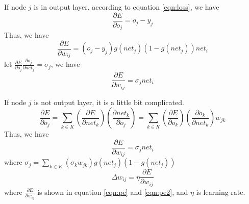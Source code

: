 \documentclass[11pt,letterpaper]{article}
\begin{document}
If node $j$ is in output layer, according to equation \ref{eqn:loss}, we have
\begin{equation}
\label{eqn:partialEOj}
\frac{\partial E}{\partial o_j}  = o_j-y_j
\end{equation}
Thus, we have 
$$\frac{\partial E}{\partial w_{ij}} = (o_j-y_j)g(net_j)(1-g(net_j))net_i$$
let $ \frac{\partial E}{\partial o_j} \frac{\partial o_j}{\partial net_j} = \sigma_j$, we have
\begin{equation}
\label{eqn:pe}
\frac{\partial E}{\partial w_{ij}} =\sigma_jnet_i
\end{equation}

If node $j$ is not output layer, it is a little bit complicated.
\begin{equation}
\label{eqn:partialEOj2}
\frac{\partial E}{\partial o_j}  = \sum_{k \in K}(\frac{\partial E}{\partial net_k})(\frac{\partial net_k}{\partial o_j})= \sum_{k \in K}(\frac{\partial E}{\partial o_k})(\frac{\partial o_k}{\partial net_k})w_{jk}
\end{equation}
Thus, we have 
\begin{equation}
\label{eqn:pe2}
\frac{\partial E}{\partial w_{ij}} =\sigma_jnet_i
\end{equation}
where $\sigma_j = \sum_{k \in K}(\sigma_kw_{jk})g(net_j)(1-g(net_j))$
\begin{equation}
\label{eqn:deltawij}
\Delta w_{ij} = \eta \frac{\partial E}{\partial w_{ij}}
\end{equation}
where $\frac{\partial E}{\partial w_{ij}}$ is shown in equation \ref{eqn:pe} and \ref{eqn:pe2}, and $\eta$ is learning rate.
\end{document}
